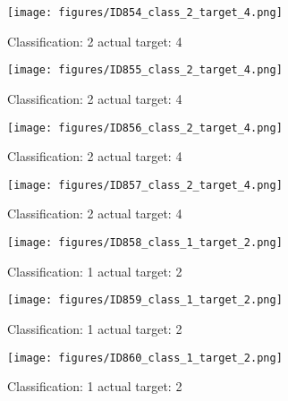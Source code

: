 \begin{figure}[h!]
\begin{center}
\texttt{[image: figures/ID854\_class\_2\_target\_4.png]}
\end{center}
\caption{ Classification: 2 actual target: 4}
\label{fig:ID854_class_2_target_4}
\end{figure}
\begin{figure}[h!]
\begin{center}
\texttt{[image: figures/ID855\_class\_2\_target\_4.png]}
\end{center}
\caption{ Classification: 2 actual target: 4}
\label{fig:ID855_class_2_target_4}
\end{figure}
\begin{figure}[h!]
\begin{center}
\texttt{[image: figures/ID856\_class\_2\_target\_4.png]}
\end{center}
\caption{ Classification: 2 actual target: 4}
\label{fig:ID856_class_2_target_4}
\end{figure}
\begin{figure}[h!]
\begin{center}
\texttt{[image: figures/ID857\_class\_2\_target\_4.png]}
\end{center}
\caption{ Classification: 2 actual target: 4}
\label{fig:ID857_class_2_target_4}
\end{figure}
\begin{figure}[h!]
\begin{center}
\texttt{[image: figures/ID858\_class\_1\_target\_2.png]}
\end{center}
\caption{ Classification: 1 actual target: 2}
\label{fig:ID858_class_1_target_2}
\end{figure}
\begin{figure}[h!]
\begin{center}
\texttt{[image: figures/ID859\_class\_1\_target\_2.png]}
\end{center}
\caption{ Classification: 1 actual target: 2}
\label{fig:ID859_class_1_target_2}
\end{figure}
\begin{figure}[h!]
\begin{center}
\texttt{[image: figures/ID860\_class\_1\_target\_2.png]}
\end{center}
\caption{ Classification: 1 actual target: 2}
\label{fig:ID860_class_1_target_2}
\end{figure}
